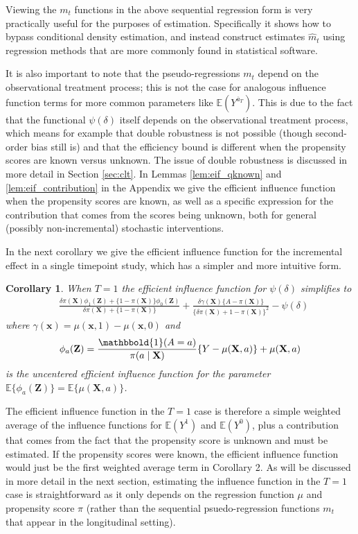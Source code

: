 \documentclass[12pt]{article}
\newcommand{\E}{\mathbb{E}}
\newcommand{\bZ}{\mathbf{Z}}
\newcommand{\bX}{\mathbf{X}}
\newcommand{\bx}{\mathbf{x}}
\newcommand{\one}{\mathbbold{1}}
\newtheorem{corollary}{Corollary}
\theoremstyle{remark}
\begin{document}
Viewing the $m_t$ functions in the above sequential regression form is very practically useful for the purposes of estimation. Specifically it shows how to bypass conditional density estimation, and instead construct estimates $\hat{m}_t$ using regression methods that are more commonly found in statistical software. 

It is also important to note that the pseudo-regressions $m_t$ depend on the observational treatment process; this is not the case for analogous influence function terms for more common parameters like $\E(Y^{\overline{a}_T})$. This is due to the fact that the functional $\psi(\delta)$ itself depends on the observational treatment process, which means for example that double robustness is not possible (though second-order bias still is) and that the efficiency bound is different when the propensity scores are known versus unknown. The issue of double robustness is discussed in more detail in Section \ref{sec:clt}. In Lemmas \ref{lem:eif_qknown} and \ref{lem:eif_contribution} in the Appendix we give the efficient influence function when the propensity scores are known, as well as a specific expression for the contribution that comes from the scores being unknown, both for general (possibly non-incremental) stochastic interventions. 

In the next corollary we give the efficient influence function for the incremental effect in a single timepoint study, which has a simpler and more intuitive form.

\begin{corollary}
When $T=1$ the efficient influence function for $\psi(\delta)$ simplifies to
\begin{align*}
&\frac{ \delta \pi(\bX)  \phi_1(\bZ) + \{1-\pi(\bX)\} \phi_0(\bZ) }{ \delta \pi(\bX) + \{1 - \pi(\bX)\} } + \frac{ \delta \gamma(\bX) \{ A - \pi(\bX)\} }{ \{ \delta \pi(\bX) + 1 - \pi(\bX) \}^2 }  - \psi(\delta)%
\end{align*}
where $\gamma(\bx)=\mu(\bx,1)-\mu(\bx,0)$ and 
$$\phi_a(\bZ)=\frac{\one(A=a)}{\pi(a \mid \bX)} \{Y-\mu(\bX,a)\} + \mu(\bX,a)$$ 
is the uncentered efficient influence function for the parameter $\E\{\phi_a(\bZ)\} = \E\{\mu(\bX,a)\}$.
\end{corollary}

The efficient influence function in the $T=1$ case is therefore a simple weighted average of the influence functions for $\E(Y^1)$ and $\E(Y^0)$, plus a contribution that comes from the fact that the propensity score is unknown and must be estimated. If the propensity scores were known, the efficient influence function would just be the first weighted average term in Corollary 2. As will be discussed in more detail in the next section, estimating the influence function in the $T=1$ case is straightforward as it only depends on the regression function $\mu$ and propensity score $\pi$ (rather than the sequential psuedo-regression functions $m_t$ that appear in the longitudinal setting).
\end{document}
